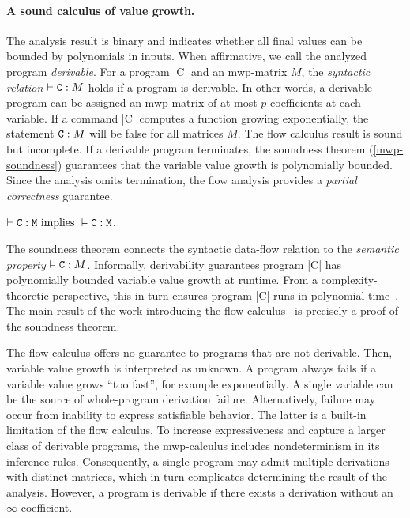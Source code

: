 \paragraph*{A sound calculus of value growth.}
The analysis result is binary and indicates whether all final values can be bounded by polynomials in inputs.
When affirmative, we call the analyzed program \emph{derivable}.
For a program \pr|C| and an mwp-matrix \(M\),
the \emph{syntactic relation} \(\vdash \prm{C} : M\) holds if a program is derivable.
In other words, a derivable program can be assigned an mwp-matrix of at most $p$-coefficients at each variable.
If a command \pr|C| computes a function growing exponentially, the statement \(\prm{C} : M\) will be false for all matrices \(M\).
The flow calculus result is sound but incomplete.
If a derivable program terminates, the soundness theorem (\cf \autoref{mwp-soundness}) guarantees that the variable value growth is polynomially bounded.
Since the analysis omits termination, the flow analysis provides a \emph{partial correctness} guarantee.

\begin{theorem}\label{mwp-soundness}
\(\vdash \prm{C} : \prm{M}\text{ implies } \vDash \prm{C} : \prm{M}\).
\end{theorem}

The soundness theorem connects the syntactic data-flow relation to the \emph{semantic property} \(\vDash \prm{C} : M\).
Informally, derivability guarantees program \pr|C| has polynomially bounded variable value growth at runtime.
From a complexity-theoretic perspective, this in turn ensures program \pr|C| runs in polynomial time~\cite{kristiansen2017}.
The main result of the work introducing the flow calculus~\cite{jones2009} is precisely a proof of the soundness theorem.

The flow calculus offers no guarantee to programs that are not derivable.
Then, variable value growth is interpreted as unknown.
A program always fails if a variable value grows \enquote{too fast}, for example exponentially.
A single variable can be the source of whole-program derivation failure.
Alternatively, failure may occur from inability to express satisfiable behavior.
The latter is a built-in limitation of the flow calculus.
To increase expressiveness and capture a larger class of derivable programs, the mwp-calculus includes nondeterminism in its inference rules.
Consequently, a single program may admit multiple derivations with distinct matrices, which in turn complicates determining the result of the analysis.
However, a program is derivable if there exists a derivation without an \(\infty\)-coefficient.

